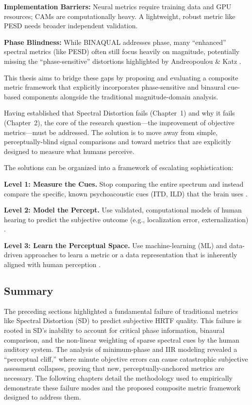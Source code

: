 \documentclass[12pt,a4paper]{article}
\begin{document}
\textbf{Implementation Barriers:} Neural metrics \cite{ananthabhotla2021} require training data and GPU resources; CAMs \cite{engel2022} are computationally heavy. A lightweight, robust metric like PESD needs broader independent validation.

\textbf{Phase Blindness:} While BINAQUAL addresses phase, many ``enhanced'' spectral metrics (like PESD) often still focus heavily on magnitude, potentially missing the ``phase-sensitive'' distortions highlighted by Andreopoulou \& Katz \cite{andreopoulou2022}.

This thesis aims to bridge these gaps by proposing and evaluating a composite metric framework that explicitly incorporates phase-sensitive and binaural cue-based components alongside the traditional magnitude-domain analysis.

Having established that Spectral Distortion fails (Chapter~1) and why it fails (Chapter~2), the core of the research question---the improvement of objective metrics---must be addressed. The solution is to move away from simple, perceptually-blind signal comparisons and toward metrics that are explicitly designed to measure what humans perceive.

The solutions can be organized into a framework of escalating sophistication:

\textbf{Level 1: Measure the Cues.} Stop comparing the entire spectrum and instead compare the specific, known psychoacoustic cues (ITD, ILD) that the brain uses \cite{wang2021}.

\textbf{Level 2: Model the Percept.} Use validated, computational models of human hearing to predict the subjective outcome (e.g., localization error, externalization) \cite{majdak2022}.

\textbf{Level 3: Learn the Perceptual Space.} Use machine-learning (ML) and data-driven approaches to learn a metric or a data representation that is inherently aligned with human perception \cite{zhang2025}.

\subsection{Summary}

The preceding sections highlighted a fundamental failure of traditional metrics like Spectral Distortion (SD) to predict subjective HRTF quality. This failure is rooted in SD's inability to account for critical phase information, binaural comparison, and the non-linear weighting of sparse spectral cues by the human auditory system. The analysis of minimum-phase and IIR modeling revealed a ``perceptual cliff,'' where minute objective errors can cause catastrophic subjective assessment collapses, proving that new, perceptually-anchored metrics are necessary. The following chapters detail the methodology used to empirically demonstrate these failure modes and the proposed composite metric framework designed to address them.
\end{document}
